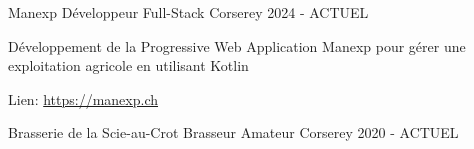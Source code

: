

\begin{cventries}

    \cventry
    {Manexp} %
    {Développeur Full-Stack} %
    {Corserey} %
    {2024 - ACTUEL} %
    {
      \begin{cvitems} %
        \item {Développement de la Progressive Web Application Manexp pour gérer une exploitation agricole en utilisant Kotlin}
        \item {Lien: \href{https://manexp.ch}{https://manexp.ch}}
      \end{cvitems}
    }

    \cventry
    {Brasserie de la Scie-au-Crot} %
    {Brasseur Amateur} %
    {Corserey} %
    {2020 - ACTUEL} %
    {}

\end{cventries}
